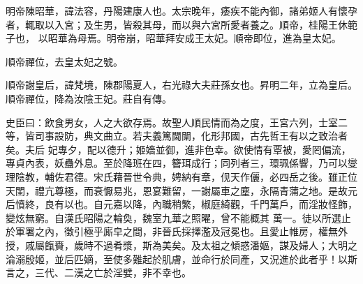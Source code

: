 \begin{pinyinscope}
 明帝陳昭華，諱法容，丹陽建康人也。太宗晚年，痿疾不能內御，諸弟姬人有懷孕者，輒取以入宮；及生男，皆殺其母，而以與六宮所愛者養之。順帝，桂陽王休範子也，
 以昭華為母焉。明帝崩，昭華拜安成王太妃。順帝即位，進為皇太妃。



 順帝禪位，去皇太妃之號。



 順帝謝皇后，諱梵境，陳郡陽夏人，右光祿大夫莊孫女也。昇明二年，立為皇后。順帝禪位，降為汝陰王妃。莊自有傳。



 史臣曰：飲食男女，人之大欲存焉。故聖人順民情而為之度，王宮六列，士室二等，皆司事設防，典文曲立。若夫義篤閫闈，化形邦國，古先哲王有以之致治者矣。夫后
 妃專夕，配以德升；姬嬙並御，進非色幸。欲使情有覃被，愛罔偏流，專貞內表，妖蠱外息。至於降班在四，簪珥成行；同列者三，環珮係響，乃可以燮理陰教，輔佐君德。宋氏藉晉世令典，娉納有章，伣天作儷，必四岳之後。雖正位天閨，禮亢尊極，而衰懨易兆，恩宴難留，一謝屬車之塵，永隔青蒲之地。是故元后憤終，良有以也。自元嘉以降，內職稍繁，椒庭綺觀，千門萬戶，而淫妝怪飾，變炫無窮。自漢氏昭陽之輪奐，魏室九華之照曜，曾不能概其
 萬一。徒以所選止於軍署之內，徵引極乎廝皁之間，非晉氏採擇濫及冠冕也。且愛止帷房，權無外授，戚屬餼賚，歲時不過肴漿，斯為美矣。及太祖之傾惑潘嫗，謀及婦人；大明之淪溺殷姬，並后匹嫡，至使多難起於肌膚，並命行於同產，又況進於此者乎！以斯言之，三代、二漢之亡於淫嬖，非不幸也。






\end{pinyinscope}